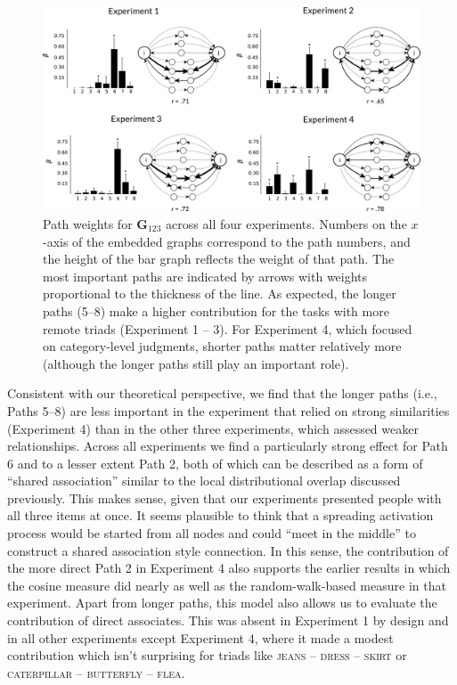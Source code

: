 \documentclass[doc]{apa6}
\newcommand{\stimulus}[1]{\textsc{#1}}
\begin{document}
\begin{figure}[t]
\centering
\includegraphics[width=16cm]{images/eightpathsBootstrapped.pdf}
\caption{\small{Path weights for $\mathbf{G}_{123}$ across all four experiments. Numbers on the $x$-axis of the embedded graphs correspond to the path numbers, and the height of the bar graph reflects the weight of that path. The most important paths are indicated by arrows with weights proportional to the thickness of the line. As expected, the longer paths (5--8) make a higher contribution for the tasks with more remote triads (Experiment 1 -- 3). For Experiment 4, which focused on category-level judgments, shorter paths matter relatively more (although the longer paths still play an important role).}}
\label{fig:pathContributions}
\end{figure}




Consistent with our theoretical perspective, we find that the longer paths (i.e., Paths 5--8) are less important in the experiment that relied on strong similarities (Experiment 4) than in the other three experiments, which assessed weaker relationships. Across all experiments we find a particularly strong effect for Path 6 and to a lesser extent Path 2, both of which can be described as a form of ``shared association'' similar to the local distributional overlap discussed previously. This makes sense, given that our experiments presented people with all three items at once. It seems plausible to think that a spreading activation process would be started from all nodes and could ``meet in the middle'' to construct a shared association style connection. In this sense, the contribution of the more direct Path 2 in Experiment 4 also supports the earlier results in which the cosine measure did nearly as well as the random-walk-based measure in that experiment.
Apart from longer paths, this model also allows us to evaluate the contribution of direct associates. This was absent in Experiment 1 by design and in all other experiments except Experiment 4, where it made a modest contribution which isn't surprising for triads like \stimulus{jeans} -- \stimulus{dress} -- \stimulus{skirt} or \stimulus{caterpillar} --  \stimulus{butterfly} -- \stimulus{flea}.
\end{document}
